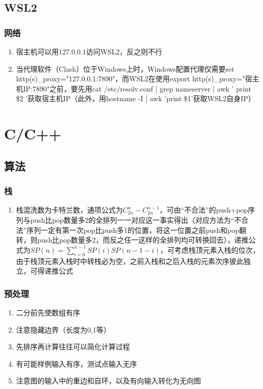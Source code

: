 \documentclass[onecolumn]{article}
\begin{document}
    \subsection{WSL2}
        \subsubsection{网络}
            \noindent
            \begin{enumerate}
                \item 宿主机可以用127.0.0.1访问WSL2，反之则不行
                \item 当代理软件（Clash）位于Windows上时，Windows配置代理仅需要set http(s)\_proxy="127.0.0.1:7890"，而WSL2在使用export http(s)\_proxy="宿主机IP:7890"之前，要先用cat /etc/resolv.conf | grep nameserver | awk '{ print \$2 }'获取宿主机IP（此外，用hostname -I | awk '{print \$1}'获取WSL2自身IP）
            \end{enumerate}
\newpage
\section{C/C++}
    \subsection{算法}
        \subsubsection{栈}
            \noindent
            \begin{enumerate}
                \item 栈混洗数为卡特兰数，通项公式为$C_{2n}^n-C_{2n}^{n-1}$，可由“不合法”的push+pop序列与push比pop数量多2的全排列一一对应这一事实得出（对应方法为“不合法”序列一定有第一次pop比push多1的位置，将这一位置之前push和pop翻转，则push比pop数量多2，而反之任一这样的全排列均可转换回去），递推公式为$SP(n)=\sum_{i=0}^{n-1}SP(i)SP(n-1-i)$，可考虑栈顶元素入栈的位次，由于栈顶元素入栈时中转栈必为空，之前入栈和之后入栈的元素次序彼此独立，可得递推公式
            \end{enumerate}
        \subsubsection{预处理}
            \noindent
            \begin{enumerate}
                \item 二分前先使数组有序
                \item 注意隐藏边界（长度为0,1等）
                \item 先排序再计算往往可以简化计算过程
                \item 有可能样例输入有序，测试点输入无序
                \item 注意图的输入中的重边和自环，以及有向输入转化为无向图
            \end{enumerate}
\end{document}
